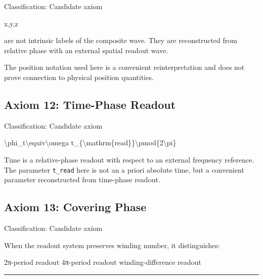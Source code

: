\documentclass[
  a4paper]{article}
\newenvironment{Shaded}{}{}
\newcommand{\NormalTok}[1]{#1}
\begin{document}
Classification: Candidate axiom

\begin{Shaded}
\begin{Highlighting}[]
\NormalTok{x,y,z}
\end{Highlighting}
\end{Shaded}

are not intrinsic labels of the composite wave. They are reconstructed
from relative phase with an external spatial readout wave.

The position notation used here is a convenient reinterpretation and
does not prove connection to physical position quantities.

\subsection{Axiom 12: Time-Phase
Readout}\label{axiom-12-time-phase-readout}

Classification: Candidate axiom

\begin{Shaded}
\begin{Highlighting}[]
\NormalTok{\textbackslash{}phi\_t\textbackslash{}equiv\textbackslash{}omega t\_\{\textbackslash{}mathrm\{read\}\}\textbackslash{}pmod\{2\textbackslash{}pi\}}
\end{Highlighting}
\end{Shaded}

Time is a relative-phase readout with respect to an external frequency
reference. The parameter \texttt{t\_read} here is not an a priori
absolute time, but a convenient parameter reconstructed from time-phase
readout.

\subsection{Axiom 13: Covering Phase}\label{axiom-13-covering-phase}

Classification: Candidate axiom

When the readout system preserves winding number, it distinguishes:

\begin{Shaded}
\begin{Highlighting}[]
\NormalTok{2π{-}period readout}
\NormalTok{4π{-}period readout}
\NormalTok{winding{-}difference readout}
\end{Highlighting}
\end{Shaded}

\begin{center}\rule{0.5\linewidth}{0.5pt}\end{center}
\end{document}
